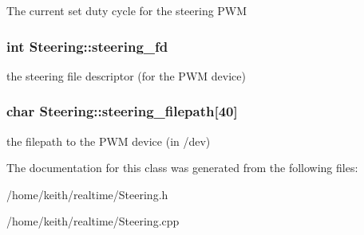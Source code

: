 The current set duty cycle for the steering P\-W\-M \hypertarget{classSteering_ae85b07902746525a57bf049d872b4f26}{
\subsubsection[{steering\-\_\-fd}]{\setlength{\rightskip}{0pt plus 5cm}int Steering\-::steering\-\_\-fd\hspace{0.3cm}{\ttfamily [protected]}}}\label{classSteering_ae85b07902746525a57bf049d872b4f26}
the steering file descriptor (for the P\-W\-M device) \hypertarget{classSteering_adfe05011b3442b1b24cd9dfc1e24ad70}{
\subsubsection[{steering\-\_\-filepath}]{\setlength{\rightskip}{0pt plus 5cm}char Steering\-::steering\-\_\-filepath\mbox{[}40\mbox{]}\hspace{0.3cm}{\ttfamily [protected]}}}\label{classSteering_adfe05011b3442b1b24cd9dfc1e24ad70}
the filepath to the P\-W\-M device (in /dev) 

The documentation for this class was generated from the following files\-:\begin{DoxyCompactItemize}
\item 
/home/keith/realtime/Steering.\-h\item 
/home/keith/realtime/Steering.\-cpp\end{DoxyCompactItemize}
